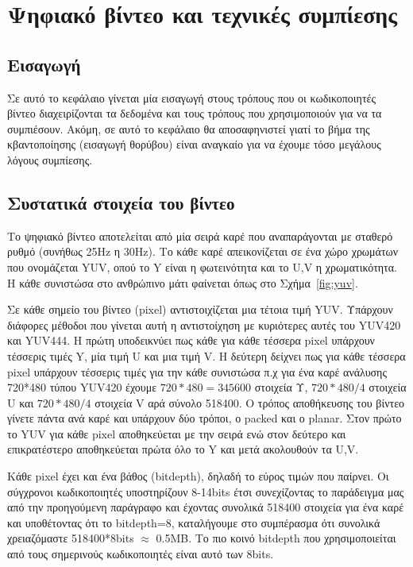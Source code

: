 ﻿\chapter{Ψηφιακό βίντεο και τεχνικές συμπίεσης}
\label{chapter:chap2}


\section{Εισαγωγή}
\label{section:sect21}
\indent Σε αυτό το κεφάλαιο γίνεται μία εισαγωγή στους τρόπους που οι κωδικοποιητές βίντεο διαχειρίζονται τα δεδομένα και τους τρόπους που χρησιμοποιούν για να τα συμπιέσουν. Ακόμη, σε αυτό το κεφάλαιο θα αποσαφηνιστεί γιατί το βήμα της κβαντοποίησης (εισαγωγή θορύβου) είναι αναγκαίο για να έχουμε τόσο μεγάλους λόγους συμπίεσης.

\section{Συστατικά στοιχεία του βίντεο}
\label{section:sect22}

\indent Το ψηφιακό βίντεο αποτελείται από μία σειρά καρέ που αναπαράγονται με σταθερό ρυθμό (συνήθως 25Hz η 30Hz). Το κάθε καρέ απεικονίζεται σε ένα χώρο χρωμάτων που ονομάζεται YUV, οπού το Y είναι η φωτεινότητα και το U,V η χρωματικότητα. Η κάθε συνιστώσα στο ανθρώπινο μάτι φαίνεται όπως στο Σχήμα~\ref{fig:yuv}.

\indent Σε κάθε σημείο του βίντεο (pixel) αντιστοιχίζεται μια τέτοια τιμή YUV. Υπάρχουν διάφορες μέθοδοι που γίνεται αυτή η αντιστοίχηση με κυριότερες αυτές του YUV420 και YUV444. Η πρώτη υποδεικνύει πως κάθε για κάθε τέσσερα pixel υπάρχουν τέσσερις τιμές Y, μία τιμή U και μια τιμή V. Η δεύτερη δείχνει πως για κάθε τέσσερα pixel υπάρχουν τέσσερις τιμές για την κάθε συνιστώσα π.χ για ένα καρέ ανάλυσης 720*480 τύπου YUV420 έχουμε \(720*480=345600\) στοιχεία Υ, \(720*480/4\) στοιχεία U και \(720*480/4 \) στοιχεία V αρά σύνολο 518400. Ο τρόπος αποθήκευσης του βίντεο γίνετε πάντα ανά καρέ και υπάρχουν δύο τρόποι, ο packed και ο planar. Στον πρώτο το YUV για κάθε pixel αποθηκεύεται με την σειρά ενώ στον δεύτερο και επικρατέστερο αποθηκεύεται πρώτα όλο το Y και μετά ακολουθούν τα U,V.

\indent Κάθε pixel έχει και ένα βάθος (bitdepth), δηλαδή το εύρος τιμών που παίρνει. Οι σύγχρονοι κωδικοποιητές υποστηρίζουν 8-14bits έτσι συνεχίζοντας το παράδειγμα μας από την προηγούμενη παράγραφο και έχοντας συνολικά 518400 στοιχεία για ένα καρέ και υποθέτοντας ότι το bitdepth=8, καταλήγουμε στο συμπέρασμα ότι συνολικά χρειαζόμαστε 518400*8bits $\approx$ 0.5MB. Το πιο κοινό bitdepth που χρησιμοποιείται από τους σημερινούς κωδικοποιητές είναι αυτό των 8bits.

